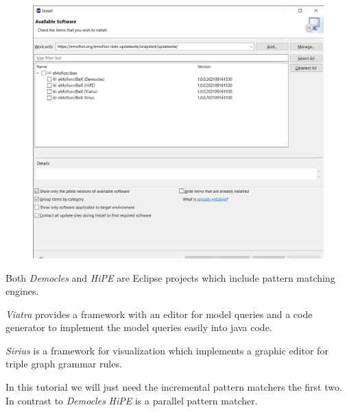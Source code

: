 \begin{figure}[h]
    \centering
    \includegraphics[scale=0.4, width =\textwidth]{pictures/eclipse-workspace - HospitalExample_model_HospitalExample.ecore - Eclipse IDE 08.11.2021 18_02_54.png}
    \caption{}
    \label{screenshot install new software eMoflon::IBeX}
\end{figure}

Both \textsf{\textit{Democles}} and \textsf{\textit{HiPE}} are Eclipse projects which include pattern matching engines.

\textsf{\textit{Viatra}} provides a framework with an editor for model queries and a code generator to implement the model queries easily into java code.

\textsf{\textit{Sirius}} is a framework for visualization which implements a graphic editor for triple graph grammar rules.\newline 

In this tutorial we will just need the incremental pattern matchers the first two. In contrast to \textsf{\textit{Democles}} \textsf{\textit{HiPE}} is a parallel pattern matcher.

\clearpage